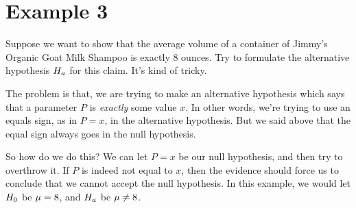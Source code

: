 \documentclass[../../../main.tex]{subfiles}
\begin{document}
\section{Example 3}

Suppose we want to show that the average volume of a container of Jimmy's Organic Goat Milk Shampoo is exactly 8 ounces. Try to formulate the alternative hypothesis $\AltHyp/$ for this claim. It's kind of tricky.

The problem is that, we are trying to make an alternative hypothesis which says that a parameter $P$ is \emph{exactly} some value $x$. In other words, we're trying to use an equals sign, as in $P = x$, in the alternative hypothesis. But we said above that the equal sign always goes in the null hypothesis.

So how do we do this? We can let $P = x$ be our null hypothesis, and then try to overthrow it. If $P$ is indeed not equal to $x$, then the evidence should force us to conclude that we cannot accept the null hypothesis. In this example, we would let $\NullHyp/$ be $\mu = 8$, and $\AltHyp/$ be $\mu \not = 8$.
\end{document}
